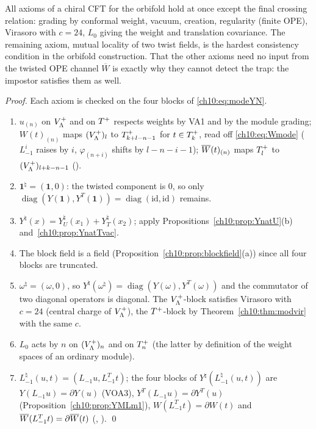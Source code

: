 \begin{physics}
All axioms of a chiral CFT for the orbifold hold at once except the final crossing relation: grading by conformal weight, vacuum, creation, regularity (finite OPE), Virasoro with $c=24$, $L_0$ giving the weight and translation covariance. The remaining axiom, mutual locality of two twist fields, is the hardest consistency condition in the orbifold construction. That the other axioms need no input from the twisted OPE channel $\overline W$ is exactly why they cannot detect the trap: the impostor satisfies them as well.
\end{physics}

\emph{Proof.}  Each axiom is checked on the four blocks of \eqref{ch10:eq:modeYN}.
\begin{enumerate}[label=(\arabic*)]
\item $u_{(n)}$ on $V_{\Lambda}^{+}$ and on $T^{+}$ respects weights by VA1 and by the module grading;
  $W(t)_{(n)}$ maps $(V_{\Lambda}^{+})_l$ to $T^{+}_{k+l-n-1}$ for $t\in T^{+}_k$, read off
  \eqref{ch10:eq:Wmode} ($L_{-1}^i$ raises by $i$, $\varphi_{(n+i)}$ shifts by $l-n-i-1$);
  $\overline{W}(t)_{(n)}$ maps $T^{+}_l$ to $(V_{\Lambda}^{+})_{l+k-n-1}$ ().
\item $\mathbf 1^\natural=(\mathbf1,0)$: the twisted component is $0$, so only
  $\operatorname{diag}(Y(\mathbf1),Y^T(\mathbf1))=\operatorname{diag}(\mathrm{id},\mathrm{id})$ remains.
\item $Y^\natural(x)=Y^\natural_U(x_1)+Y^\natural_T(x_2)$; apply Propositions~\ref{ch10:prop:YnatU}(b)
  and~\ref{ch10:prop:YnatTvac}.
\item The block field is a field (Proposition~\ref{ch10:prop:blockfield}(a)) since all four
  blocks are truncated.
\item $\omega^\natural=(\omega,0)$, so $Y^\natural(\omega^\natural)=\operatorname{diag}(Y(\omega),Y^T(\omega))$
  and the commutator of two diagonal operators is diagonal.  The $V_{\Lambda}^{+}$-block satisfies
  Virasoro with $c=24$ (central charge of $V_{\Lambda}^{+}$), the $T^{+}$-block by
  Theorem~\ref{ch10:thm:modvir} with the same $c$.
\item $L_0$ acts by $n$ on $(V_{\Lambda}^{+})_n$ and on $T^{+}_n$ (the latter by definition of the weight
  spaces of an ordinary module).
\item $L^\natural_{-1}(u,t)=(L_{-1}u,L_{-1}^Tt)$; the four blocks of $Y^\natural(L^\natural_{-1}(u,t))$ are
  $Y(L_{-1}u)=\partial Y(u)$ (VOA3), $Y^T(L_{-1}u)=\partial Y^T(u)$
  (Proposition~\ref{ch10:prop:YMLm1}), $W(L^T_{-1}t)=\partial W(t)$ and
  $\overline{W}(L_{-1}^Tt)=\partial\overline{W}(t)$ (, ). \qed
\end{enumerate}

